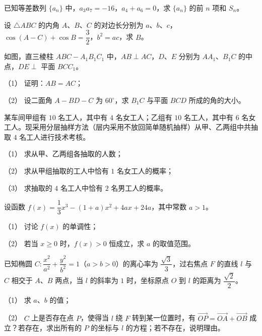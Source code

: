 \begin{question}
已知等差数列 $\{a_n\}$ 中，$a_3a_7=-16$，$a_4+a_6=0$，求 $\{a_n\}$ 的前 $n$ 项和 $S_n$。

\end{question}
\begin{question}
设 $\triangle ABC$ 的内角 $A\text{、}B\text{、}C$ 的对边长分别为 $a\text{、}b\text{、}c$，$\cos(A-C)+\cos B=\dfrac32$，$b^2=ac$，求 $B$。

\Needspace{0.4\textheight}
\end{question}
\begin{question}
如图，直三棱柱 $ABC-A_1B_1C_1$ 中，$AB\perp AC$，$D\text{、}E$ 分别为 $AA_1\text{、}B_1C$ 的中点，$DE\perp$ 平面 $BCC_1$。
\nopagebreak[4]
\begin{center}\end{center}
\nopagebreak[4]
（1） 证明：$AB=AC$；

（2） 设二面角 $A-BD-C$ 为 $60^\circ$，求 $B_1C$ 与平面 $BCD$ 所成的角的大小。

\end{question}
\begin{question}
某车间甲组有 $10$ 名工人，其中有 $4$ 名女工人；乙组有 $10$ 名工人，其中有 $6$ 名女工人。现采用分层抽样方法（层内采用不放回简单随机抽样）从甲、乙两组中共抽取 $4$ 名工人进行技术考核。

（1） 求从甲、乙两组各抽取的人数；

（2） 求从甲组抽取的工人中恰有 $1$ 名女工人的概率；

（3） 求抽取的 $4$ 名工人中恰有 $2$ 名男工人的概率。

\end{question}
\begin{question}
设函数 $f(x)=\dfrac13x^3-(1+a)x^2+4ax+24a$，其中常数 $a>1$。

（1） 讨论 $f(x)$ 的单调性；

（2） 若当 $x\geqslant0$ 时，$f(x)>0$ 恒成立，求 $a$ 的取值范围。

\end{question}
\begin{question}
已知椭圆 $C:\dfrac{x^2}{a^2}+\dfrac{y^2}{b^2}=1$（$a>b>0$）的离心率为 $\dfrac{\sqrt3}{3}$，过右焦点 $F$ 的直线 $l$ 与 $C$ 相交于 $A\text{、}B$ 两点，当 $l$ 的斜率为 $1$ 时，坐标原点 $O$ 到 $l$ 的距离为 $\dfrac{\sqrt2}{2}$。

（1） 求 $a\text{、}b$ 的值；

（2） $C$ 上是否存在点 $P$，使得当 $l$ 绕 $F$ 转到某一位置时，有 $\overrightarrow{OP}=\overrightarrow{OA}+\overrightarrow{OB}$ 成立？若存在，求出所有的 $P$ 的坐标与 $l$ 的方程；若不存在，说明理由。

\end{question}